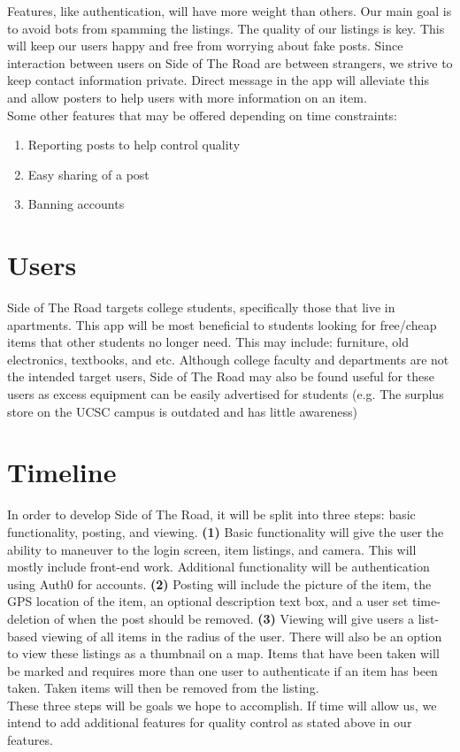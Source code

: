 \documentclass[sigconf]{acmart}
\begin{document}
\noindent
Features, like authentication, will have more weight than others. Our main goal is to avoid bots from spamming the listings. The quality of our listings is key. This will keep our users happy and free from worrying about fake posts. Since interaction between users on Side of The Road are between strangers, we strive to keep contact information private. Direct message in the app will alleviate this and allow posters to help users with more information on an item. \\

\noindent
Some other features that may be offered depending on time constraints:
\begin{enumerate}
	\item Reporting posts to help control quality
	\item Easy sharing of a post
	\item Banning accounts
\end{enumerate}


\section{Users}
Side of The Road targets college students, specifically those that live in apartments. This app will be most beneficial to students looking for free/cheap items that other students no longer need. This may include: furniture, old electronics, textbooks, and etc. Although college faculty and departments are not the intended target users, Side of The Road may also be found useful for these users as excess equipment can be easily advertised for students (e.g. The surplus store on the UCSC campus is outdated and has little awareness)

\section{Timeline}
In order to develop Side of The Road, it will be split into three steps: basic functionality, posting, and viewing.
\textbf{(1)} Basic functionality will give the user the ability to maneuver to the login screen, item listings, and camera. This will mostly include front-end work. Additional functionality will be authentication using Auth0 for accounts.
\textbf{(2)} Posting will include the picture of the item, the GPS location of the item, an optional description text box, and a user set time-deletion of when the post should be removed. 
\textbf{(3)} Viewing will give users a list-based viewing of all items in the radius of the user. There will also be an option to view these listings as a thumbnail on a map. Items that have been taken will be marked and requires more than one user to authenticate if an item has been taken. Taken items will then be removed from the listing. \\

\noindent
These three steps will be goals we hope to accomplish. If time will allow us, we intend to add additional features for quality control as stated above in our features.
\end{document}
